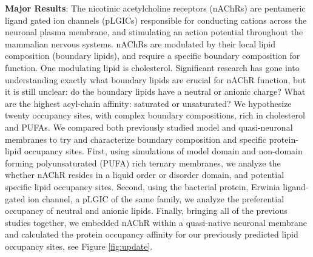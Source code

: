 \documentclass[oneside]{report}
\begin{document}
{\bf Major Results}:
The nicotinic acetylcholine receptors (nAChRs) are pentameric ligand gated ion channels (pLGICs) responsible for conducting cations across the neuronal plasma membrane, and stimulating an action potential throughout the mammalian nervous systems. nAChRs are modulated by their local lipid composition (boundary lipids), and require a specific boundary composition for function. One modulating lipid is cholesterol.  Significant research has gone into understanding exactly what boundary lipids are crucial for nAChR function, but it is still unclear: do the boundary lipids have a neutral or anionic charge? What are the highest acyl-chain affinity: saturated or unsaturated? We hypothesize twenty occupancy sites, with complex boundary compositions, rich in cholesterol and PUFAs. We compared both previously studied model and quasi-neuronal membranes to try and characterize boundary composition and specific protein-lipid occupancy sites. First, using simulations of model domain and non-domain forming polyunsaturated (PUFA) rich ternary membranes, we analyze the whether nAChR resides in a liquid order or disorder domain, and potential specific lipid occupancy sites. Second, using the bacterial protein, Erwinia ligand-gated ion channel, a pLGIC of the same family, we analyze the preferential occupancy of neutral and anionic lipids. Finally, bringing all of the previous studies together, we embedded nAChR within a quasi-native neuronal membrane and calculated the protein occupancy affinity for our previously predicted lipid occupancy sites, see Figure \ref{fig:update}.
\end{document}
